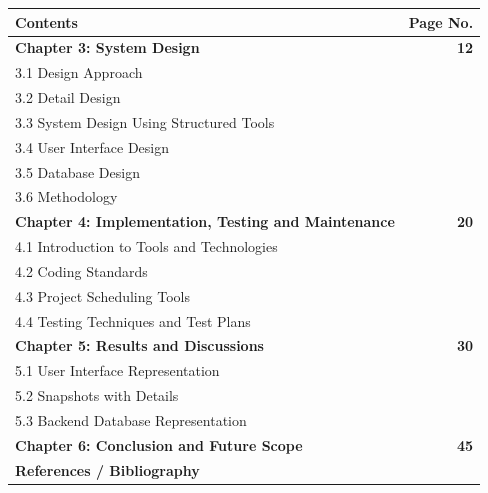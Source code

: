 \documentclass[12pt,a4paper]{report}
\begin{document}
\newpage
\renewcommand{\arraystretch}{1.2}
\setlength{\tabcolsep}{20pt}

{\centering
\fontsize{14pt}{16pt}\selectfont
\begin{tabular*}{\textwidth}{@{\extracolsep{\fill}} l r }
    \toprule
    \textbf{Contents} & \textbf{Page No.} \\
    \midrule
    \addlinespace[0.5cm]
    \textbf{Chapter 3: System Design} & \textbf{12} \\
    \hspace{2.4cm}3.1 Design Approach & \\
    \hspace{2.4cm}3.2 Detail Design &  \\
    \hspace{2.4cm}3.3 System Design Using Structured Tools & \\
    \hspace{2.4cm}3.4 User Interface Design & \\
    \hspace{2.4cm}3.5 Database Design & \\
    \hspace{2.4cm}3.6 Methodology & \\
    \textbf{Chapter 4: Implementation, Testing and Maintenance} & \textbf{20} \\
    \hspace{2.4cm}4.1 Introduction to Tools and Technologies & \\
    \hspace{2.4cm}4.2 Coding Standards &  \\
    \hspace{2.4cm}4.3 Project Scheduling Tools & \\
    \hspace{2.4cm}4.4 Testing Techniques and Test Plans & \\
    \textbf{Chapter 5: Results and Discussions} & \textbf{30} \\
    \hspace{2.4cm}5.1 User Interface Representation & \\
    \hspace{2.4cm}5.2 Snapshots with Details &  \\
    \hspace{2.4cm}5.3 Backend Database Representation & \\
    \textbf{Chapter 6: Conclusion and Future Scope} & \textbf{45} \\
    \textbf{References / Bibliography}
\end{tabular*}\par}
\end{document}
